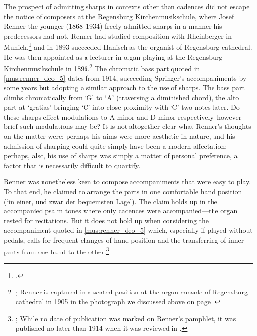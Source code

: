 The prospect of admitting sharps in contexts other than cadences did not escape the notice of composers at the Regensburg Kirchenmusikschule, where Josef Renner the younger (1868--1934) freely admitted sharps in a manner his predecessors had not.
Renner had studied composition with Rheinberger in Munich,\footcite[260]{KillyDictionaryGermanBiography2005} and in 1893 succeeded Hanisch as the organist of Regensburg cathedral.
He was then appointed as a lecturer in organ playing at the Regensburg Kirchenmusikschule in 1896.\footnote{\cite[326]{VierhausDeutschebiographischeEnzyklopaedie2007}; Renner is captured in a seated position at the organ console of Regensburg cathedral in 1905 in the photograph we discussed above on page \pageref{ln:renner_photo}.}
The chromatic bass part quoted in \cref{mus:renner_deo_5} dates from 1914, succeeding Springer's accompaniments by some years but adopting a similar approach to the use of sharps.
The bass part climbs chromatically from `G' to `A' (traversing a diminished chord), the alto part at `gratias' bringing `C'\kern 1pt\sharp{} into close proximity with `C'\kern 1pt\natural{} two notes later.
Do these sharps effect modulations to A minor and D minor respectively, however brief such modulations may be?
It is not altogether clear what Renner's thoughts on the matter were: perhaps his aims were more aesthetic in nature, and his admission of sharping could quite simply have been a modern affectation; perhaps, also, his use of sharps was simply a matter of personal preference, a factor that is necessarily difficult to quantify.

Renner was nonetheless keen to compose accompaniments that were easy to play.
To that end, he claimed to arrange the parts in one comfortable hand position (`in einer, und zwar der bequemsten Lage').
The claim holds up in the accompanied psalm tones where only cadences were accompanied---the organ rested for recitations.
But it does not hold up when considering the accompaniment quoted in \cref{mus:renner_deo_5} which, especially if played without pedals, calls for frequent changes of hand position and the transferring of inner parts from one hand to the other.\footnote{\cite[unpaginated `Vorwort', p.~5]{RennerOrganumcomitansad1914}; While no date of publication was marked on Renner's pamphlet, it was published no later than 1914 when it was reviewed in \cite[383]{BooksReceived1914}.}

